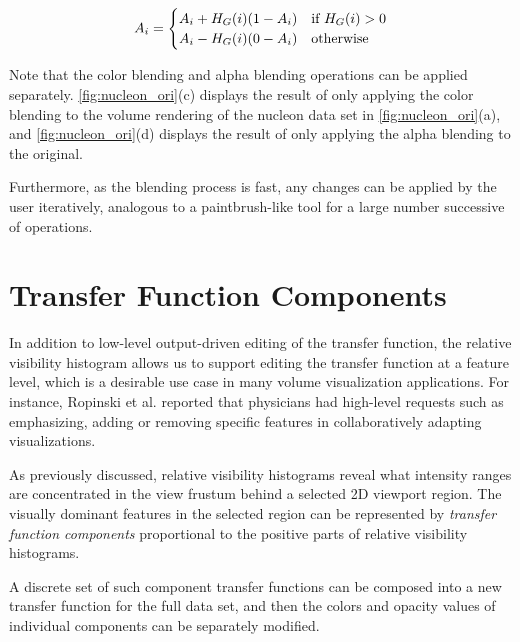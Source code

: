 \documentclass[twoside,twocolumn,10pt]{article}
\begin{document}
\[
A_{i} =
\begin{cases}
A_{i}+H_{G}(i)(1-A_{i}) & \text{if $ H_{G}(i)>0 $} \\
A_{i}-H_{G}(i)(0-A_{i}) & \text{otherwise}
\end{cases}
\]

Note that the color blending and alpha blending operations can be applied separately. \autoref{fig:nucleon_ori}(c) displays the result of only applying the color blending to the volume rendering of the nucleon data set in \autoref{fig:nucleon_ori}(a), and \autoref{fig:nucleon_ori}(d) displays the result of only applying the alpha blending to the original.

Furthermore, as the blending process is fast, any changes can be applied by the user iteratively, analogous to a paintbrush-like tool for a large number successive of operations.

\section{Transfer Function Components} \label{transfer_function_components}


In addition to low-level output-driven editing of the transfer function, the relative visibility histogram allows us to support editing the transfer function at a feature level, which is a desirable use case in many volume visualization applications. For instance, Ropinski et al. \cite{ropinski_stroke-based_2008} reported that physicians had high-level requests such as emphasizing, adding or removing specific features in collaboratively adapting visualizations.

As previously discussed, relative visibility histograms reveal what intensity ranges are concentrated in the view frustum behind a selected 2D viewport region. The visually dominant features in the selected region can be represented by \emph{transfer function components} proportional to the positive parts of relative visibility histograms.

A discrete set of such component transfer functions can be composed into a new transfer function for the full data set, and then the colors and opacity values of individual components can be separately modified.

\end{document}
